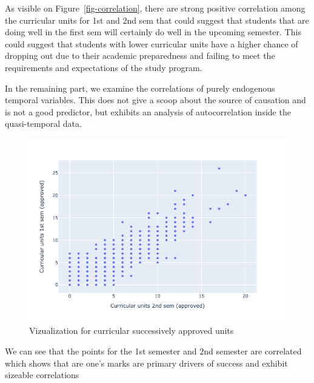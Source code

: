 \documentclass[
  letterpaper,
  DIV=11,
  numbers=noendperiod]{scrartcl}
\begin{document}
As visible on Figure~\ref{fig-correlation}, there are strong positive
correlation among the curricular units for 1st and 2nd sem that could
suggest that students that are doing well in the first sem will
certainly do well in the upcoming semester. This could suggest that
students with lower curricular units have a higher chance of dropping
out due to their academic preparedness and failing to meet the
requirements and expectations of the study program.

In the remaining part, we examine the correlations of purely endogenous
temporal variables. This does not give a scoop about the source of
causation and is not a good predictor, but exhibits an analysis of
autocorrelation inside the quasi-temporal data.

\begin{figure}

{\centering \includegraphics{report_AzadhdhinNedalYunisAlFraijat_files/figure-pdf/fig-cur-units-output-1.png}

}

\caption{\label{fig-cur-units}Vizualization for curricular successively
approved units}

\end{figure}

We can see that the points for the 1st semester and 2nd semester are
correlated which shows that are one's marks are primary drivers of
success and exhibit sizeable correlations
\end{document}

